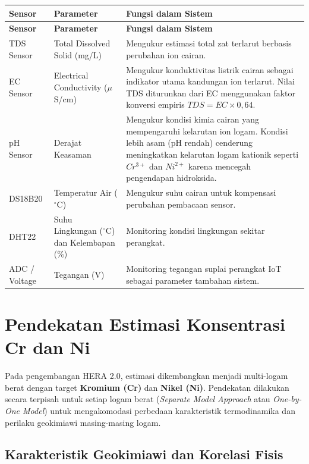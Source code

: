 \documentclass[12pt,a4paper]{article}
\begin{document}
\begin{longtable}{|p{3cm}|p{4cm}|p{6cm}|}
\hline
\textbf{Sensor} & \textbf{Parameter} & \textbf{Fungsi dalam Sistem} \\
\hline
\endfirsthead
\hline
\textbf{Sensor} & \textbf{Parameter} & \textbf{Fungsi dalam Sistem} \\
\hline
\endhead
TDS Sensor & Total Dissolved Solid (mg/L) & Mengukur estimasi total zat terlarut berbasis perubahan ion cairan. \\
\hline
EC Sensor & Electrical Conductivity ($\mu$S/cm) & Mengukur konduktivitas listrik cairan sebagai indikator utama kandungan ion terlarut. Nilai TDS diturunkan dari EC menggunakan faktor konversi empiris $TDS = EC \times 0{,}64$. \\
\hline
pH Sensor & Derajat Keasaman & Mengukur kondisi kimia cairan yang mempengaruhi kelarutan ion logam. Kondisi lebih asam (pH rendah) cenderung meningkatkan kelarutan logam kationik seperti $Cr^{3+}$ dan $Ni^{2+}$ karena mencegah pengendapan hidroksida. \\
\hline
DS18B20 & Temperatur Air ($^{\circ}$C) & Mengukur suhu cairan untuk kompensasi perubahan pembacaan sensor. \\
\hline
DHT22 & Suhu Lingkungan ($^{\circ}$C) dan Kelembapan (\%) & Monitoring kondisi lingkungan sekitar perangkat. \\
\hline
ADC / Voltage & Tegangan (V) & Monitoring tegangan suplai perangkat IoT sebagai parameter tambahan sistem. \\
\hline
\end{longtable}


\section{Pendekatan Estimasi Konsentrasi Cr dan Ni}

Pada pengembangan HERA 2.0, estimasi dikembangkan menjadi multi-logam berat dengan target \textbf{Kromium (Cr)} dan \textbf{Nikel (Ni)}. Pendekatan dilakukan secara terpisah untuk setiap logam berat (\textit{Separate Model Approach} atau \textit{One-by-One Model}) untuk mengakomodasi perbedaan karakteristik termodinamika dan perilaku geokimiawi masing-masing logam.

\subsection{Karakteristik Geokimiawi dan Korelasi Fisis}
\end{document}

